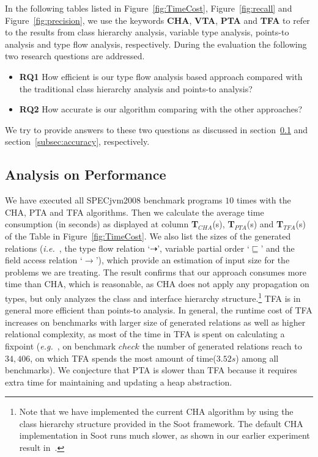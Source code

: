 \documentclass{fac}
\newcommand\eg{\textit{e.g.\ }}
\newcommand\ie{\textit{i.e.\ }}
\newcommand{\less}{\sqsubseteq}
\newcommand{\tflow}{\dashrightarrow}
\newcommand{\hflow}{\longrightarrow}
\begin{document}
In the following tables listed in Figure~\ref{fig:TimeCost}, Figure~\ref{fig:recall} and Figure~\ref{fig:precision}, we use the keywords \textbf{CHA}, \textbf{VTA}, \textbf{PTA} and \textbf{TFA} to refer to the results from class hierarchy analysis, variable type analysis, points-to analysis and type flow analysis, respectively. During the evaluation the following two research questions are addressed. %
\begin{itemize}
\item \textbf{RQ1} How efficient is our type flow analysis based approach compared with the traditional class hierarchy analysis and points-to analysis?
\item \textbf{RQ2} How accurate is our algorithm comparing with the other approaches?
\end{itemize}
We try to provide answers to these two questions as discussed in section~\ref{subsec:efficiency} and section~\ref{subsec:accuracy}, respectively.

\subsection{Analysis on Performance}\label{subsec:efficiency}

We have executed all SPECjvm2008 benchmark programs $10$ times with the CHA, PTA and TFA algorithms. Then we calculate the average time consumption (in seconds) as displayed at column \textbf{T$_{CHA}$}(s), \textbf{T$_{PTA}$}(s) and \textbf{T$_{TFA}$}(s) of the Table in Figure~\ref{fig:TimeCost}. We also list the sizes of the generated relations (\ie, the type flow relation `$\tflow$', variable partial order `$\less$' and the field access relation `$\hflow$'), which provide an estimation of input size for the problems we are treating. The result confirms that our approach consumes more time than CHA, which is reasonable, as CHA does not apply any propagation on types, but only analyzes the class and interface hierarchy structure.\footnote{Note that we have implemented the current CHA algorithm by using the class hierarchy structure provided in the Soot framework. The default CHA implementation in Soot runs much slower, as shown in our earlier experiment result in~\cite{ZhuoZ19}.} TFA is in general more efficient than points-to analysis. In general, the runtime cost of TFA increases on benchmarks with larger size of generated relations as well as higher relational complexity, as most of the time in TFA is spent on calculating a fixpoint (\eg, on benchmark $check$ the number of generated relations reach to $34,406$, on which TFA spends the most amount of time($3.52s$) among all benchmarks). We conjecture that PTA is slower than TFA because it requires extra time for maintaining and updating a heap abstraction.
\end{document}
